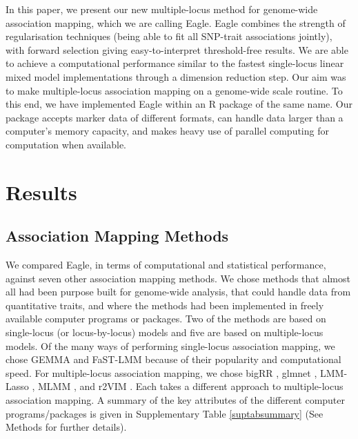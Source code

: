 \documentclass{article}
\begin{document}
In this paper, we present our new multiple-locus method for genome-wide association mapping, which we are calling Eagle. 
Eagle combines the strength of regularisation techniques (being able to fit all SNP-trait associations jointly), with forward selection giving easy-to-interpret threshold-free results.   We are able to achieve a computational performance similar to the fastest single-locus linear mixed model implementations 
through a dimension reduction step.
Our aim was to make multiple-locus association mapping on a genome-wide scale routine. To this end, we have implemented Eagle 
within an R package of the same name. 
Our package accepts marker data of different 
formats,  can handle data larger than a computer's  memory capacity, and makes heavy use of 
parallel computing for computation when available.  


\section{Results}

\subsection{Association Mapping Methods}

We compared Eagle, in terms of computational and statistical performance, against seven other association mapping methods. 
We chose methods that almost all had been purpose built for genome-wide analysis, that could handle data from quantitative traits, and where the methods had been implemented in freely available computer programs or packages. Two of the methods are based on single-locus (or locus-by-locus) models and five are based on multiple-locus models. Of the many ways of performing single-locus association mapping, we chose 
GEMMA \cite{zhou2012genome}  and FaST-LMM \cite{lippert2011fast} because of their popularity and computational speed. 
For multiple-locus association mapping, we chose bigRR \cite{shen2013novel}, glmnet \cite{Friedman2010glmnet}, 
LMM-Lasso \cite{rakitsch2013lasso}, MLMM \cite{segura2012efficient} , and r2VIM \cite{szymczak2016r2vim}.  
Each takes a different approach to multiple-locus association mapping. A summary of the key attributes of the different computer programs/packages 
is given in Supplementary Table \ref{suptabsummary} (See Methods for further details). 

 
\end{document}
